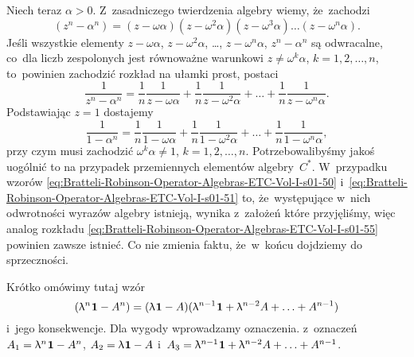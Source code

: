 \documentclass[a4paper,11pt]{article}
\numberwithin{equation}{section}
\renewcommand{\lambda}{\uplambda}
\begin{document}
Niech teraz $\alpha > 0$. Z~zasadniczego twierdzenia algebry wiemy, że~zachodzi
\begin{equation}
  \label{eq:Bratteli-Robinson-Operator-Algebras-ETC-Vol-I-s01-53}
  ( z^{ n } - \alpha^{ n } ) =
  ( z - \omega \alpha ) ( z - \omega^{ 2 } \alpha ) ( z - \omega^{ 3 } \alpha ) \ldots
  ( z - \omega^{ n } \alpha ).
\end{equation}
Jeśli wszystkie elementy $z - \omega \alpha$, $z - \omega^{ 2 } \alpha$, \ldots, $z - \omega^{ n } \alpha$,
$z^{ n } - \alpha^{ n }$ są odwracalne, co~dla liczb zespolonych jest równoważne
warunkowi $z \neq \omega^{ k } \alpha$,  $k = 1, 2, \ldots, n$, to~powinien zachodzić rozkład
na ułamki prost, postaci
\begin{equation}
  \label{eq:Bratteli-Robinson-Operator-Algebras-ETC-Vol-I-s01-54}
  \frac{ 1 }{ z^{ n } - \alpha^{ n } } =
  \frac{ 1 }{ n } \frac{ 1 }{ z - \omega \alpha } +
  \frac{ 1 }{ n } \frac{ 1 }{ z - \omega^{ 2 } \alpha } + \ldots +
  \frac{ 1 }{ n } \frac{ 1 }{ z - \omega^{ n } \alpha }.
\end{equation}
Podstawiając $z = 1$ dostajemy
\begin{equation}
  \label{eq:Bratteli-Robinson-Operator-Algebras-ETC-Vol-I-s01-55}
  \frac{ 1 }{ 1 - \alpha^{ n } } =
  \frac{ 1 }{ n } \frac{ 1 }{ 1 - \omega \alpha } +
  \frac{ 1 }{ n } \frac{ 1 }{ 1 - \omega^{ 2 } \alpha } + \ldots +
  \frac{ 1 }{ n } \frac{ 1 }{ 1 - \omega^{ n } \alpha },
\end{equation}
przy czym musi zachodzić $\omega^{ k } \alpha \neq 1$, $k = 1, 2, \ldots, n$.
Potrzebowalibyśmy jakoś uogólnić to na przypadek przemiennych elementów
algebry~$C^{ * }$. W~przypadku wzorów
\eqref{eq:Bratteli-Robinson-Operator-Algebras-ETC-Vol-I-s01-50}
i~\eqref{eq:Bratteli-Robinson-Operator-Algebras-ETC-Vol-I-s01-51} to,
że~występujące w~nich odwrotności wyrazów algebry istnieją, wynika z~założeń
które przyjęliśmy, więc analog rozkładu
\eqref{eq:Bratteli-Robinson-Operator-Algebras-ETC-Vol-I-s01-55} powinien
zawsze istnieć. Co nie zmienia faktu, że~w~końcu dojdziemy do sprzeczności.

\VerSpaceFour





\noindent
{} Krótko omówimy tutaj wzór
\begin{equation}
  \label{eq:Bratteli-Robinson-Operator-Algebras-ETC-Vol-I-s01-56}
  ( \lambda^{ n } \HorSpaceOne \UnitAlg - A^{ n } ) =
  ( \lambda \HorSpaceOne \UnitAlg - A )
  ( \lambda^{ n - 1 } \HorSpaceOne \UnitAlg + \lambda^{ n - 2 } A + \ldots +
  A^{ n - 1 } )
\end{equation}
i~jego konsekwencje. Dla wygody wprowadzamy oznaczenia. z~oznaczeń
$A_{ 1 } = \lambda^{ n } \HorSpaceOne \UnitAlg - A^{ n }$,
$A_{ 2 } = \lambda \HorSpaceOne \UnitAlg - A$
i~$A_{ 3 } = \lambda^{ n - 1 } \HorSpaceOne \UnitAlg + \lambda^{ n - 2 } A + \ldots + A^{ n - 1 }$.
\end{document}
